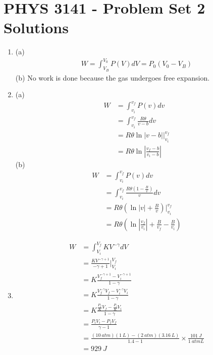 \documentclass[a4paper,12pt]{article}
\begin{document}
\section*{PHYS 3141 - Problem Set 2 Solutions}

\begin{enumerate}

    \item (a)
    \begin{align*}
        W = \int_{V_B}^{V_0} P(V) dV = P_0 (V_0 - V_B)
    \end{align*}
    (b) No work is done because the gas undergoes free expansion.
    
    \item (a)
    \begin{align*}
	    W &= \int_{v_i}^{v_f} P(v) dv \\
	    &= \int_{v_i}^{v_f} \frac{R \theta}{v - b} dv \\
	    &= R \theta \ln|v - b| \biggr\rvert_{v_i}^{v_f} \\
	    &= R \theta \ln \left| \frac{v_f - b}{v_i - b} \right|
    \end{align*}
    (b)
    \begin{align*}
	    W &= \int_{v_i}^{v_f} P(v) dv \\
	    &= \int_{v_i}^{v_f} \frac{R \theta (1 - \frac{B}{v})}{v}dv \\
	    &= R \theta \left(\ln|v| + \frac{B}{v} \right) \biggr \rvert_{v_i}^{v_f} \\
	    &= R \theta \left(\ln \left| \frac{v_f}{v_i} \right| + \frac{B}{v_f} - \frac{B}{v_i} \right)
    \end{align*}
    
    \item
    \begin{align*}
        W &= \int_{V_i}^{V_f} K V^{-\gamma} dV \\
        &= \frac{KV^{-\gamma + 1}}{-\gamma + 1} \biggr \rvert_{V_i}^{V_f} \\
        &= K\frac{V_f^{-\gamma + 1} - V_i^{-\gamma + 1}}{1 - \gamma} \\
        &= K\frac{V_f^{-\gamma}V_f - V_i^{-\gamma}V_i}{1 - \gamma} \\
        &= K\frac{\frac{P_f}{K} V_f - \frac{P_i}{K} V_i}{1 - \gamma} \\
        &= \frac{P_i V_i - P_f V_f}{\gamma - 1} \\
        &= \frac{(\SI{10}{atm})(\SI{1}{L}) - (\SI{2}{atm})(\SI{3.16}{L})}{1.4 - 1} \times \frac{\SI{101}{J}}{\SI{1}{atm L}} \\
        &= \SI{929}{J}
    \end{align*}


\end{enumerate}
\end{document}
